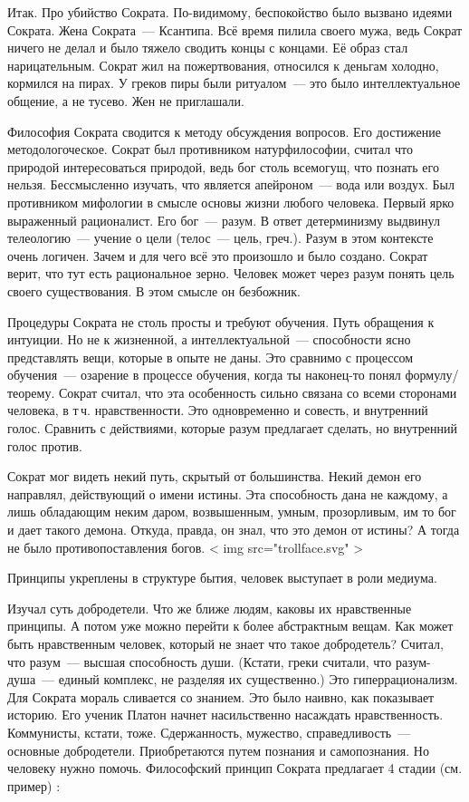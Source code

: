 Итак. Про убийство Сократа. По-видимому, беспокойство было вызвано идеями Сократа. 
Жена Сократа~--- Ксантипа. Всё время пилила своего мужа, ведь Сократ ничего не делал и было тяжело сводить концы с концами. Её образ стал нарицательным. 
Сократ жил на пожертвования, относился к деньгам холодно, кормился на пирах. У греков пиры были ритуалом~--- это было интеллектуальное общение, а не тусево. Жен не приглашали. 

Философия Сократа сводится к методу обсуждения вопросов. Его достижение методологоческое. 
Сократ был противником натурфилософии, считал что природой интересоваться природой, ведь бог столь всемогущ, что познать его нельзя. Бессмысленно изучать, что является апейроном~--- вода или воздух. 
Был противником мифологии в смысле основы жизни любого человека. Первый ярко выраженный рационалист. Его бог~--- разум. В ответ детерминизму выдвинул телеологию~--- учение о цели (телос~--- цель, греч.). 
Разум в этом контексте очень логичен. Зачем и для чего всё это произошло и было создано. Сократ верит, что тут есть рациональное зерно. Человек может через разум понять цель своего существования. В этом смысле он безбожник. 

Процедуры Сократа не столь просты и требуют обучения. Путь обращения к интуиции. Но не к жизненной, а интеллектуальной~--- способности ясно представлять вещи, которые в опыте не даны. 
Это сравнимо с процессом обучения~--- озарение в процессе обучения, когда ты наконец-то понял формулу/теорему. Сократ считал, что эта особенность сильно связана со всеми сторонами человека, в т\,ч. нравственности. 
Это одновременно и совесть, и внутренний голос. Сравнить с действиями, которые разум предлагает сделать, но внутренний голос против. 

Сократ мог видеть некий путь, скрытый от большинства. Некий демон его направлял, действующий о имени истины. Эта способность дана не каждому, а лишь обладающим неким даром, возвышенным, умным, прозорливым, им то бог и дает такого демона. 
Откуда, правда, он знал, что это демон от истины? А тогда не было противопоставления богов. < img src="trollface.svg" >

Принципы укреплены в структуре бытия, человек выступает в роли медиума. 

Изучал суть добродетели. Что же ближе людям, каковы их нравственные принципы. А потом уже можно перейти к более абстрактным вещам. 
Как может быть нравственным человек, который не знает что такое добродетель? Считал, что разум~--- высшая способность души. (Кстати, греки считали, что разум-душа~--- единый комплекс, не разделяя их существенно.) Это гиперрационализм. 
Для Сократа мораль сливается со знанием. Это было наивно, как показывает историю. Его ученик Платон начнет насильственно насаждать нравственность. Коммунисты, кстати, тоже. 
Сдержанность, мужество, справедливость~--- основные добродетели. Приобретаются путем познания и самопознания. Но человеку нужно помочь. 
Философский принцип Сократа предлагает 4 стадии (см. пример) :


